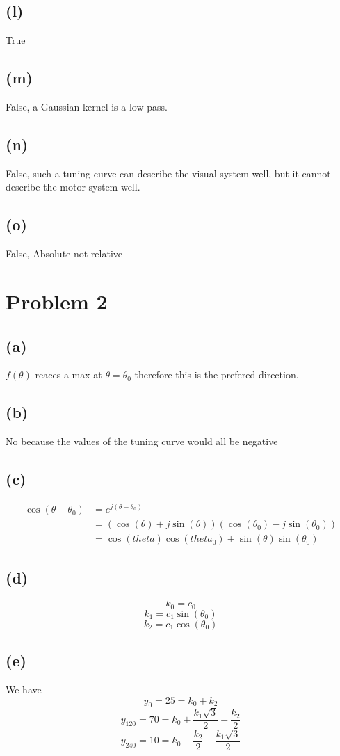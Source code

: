 \documentclass[12pt]{article}
\begin{document}
\subsection*{(l)}
True
\subsection*{(m)}
False, a Gaussian kernel is a low pass.
\subsection*{(n)}
False, such a tuning curve can describe the visual system well, but it cannot describe the motor system well.
\subsection*{(o)}
False, Absolute not relative


\section*{Problem 2}
\subsection*{(a)}
$f(\theta)$ reaces a max at $\theta=\theta_0$ therefore this
is the prefered direction.
\subsection*{(b)}
No because the values of the tuning curve would all be negative
\subsection*{(c)}
\begin{align*}
    \cos(\theta-\theta_0)&=e^{j(\theta-\theta_0)}\\
    &=(\cos(\theta)+j\sin(\theta))(\cos(\theta_0)-j\sin(\theta_0))\\
    &=\cos(theta)\cos(theta_0)+\sin(\theta)\sin(\theta_0)
\end{align*}
\subsection*{(d)}
$$k_0=c_0$$
$$k_1=c_1\sin(\theta_0)$$
$$k_2=c_1\cos(\theta_0)$$
\subsection*{(e)}
We have
$$y_0=25=k_0+k_2$$
$$y_{120}=70=k_0+\frac{k_1\sqrt{3}}{2}-\frac{k_2}{2}$$
$$y_{240}=10=k_0-\frac{k_2}{2}-\frac{k_1\sqrt{3}}{2}$$
\end{document}
